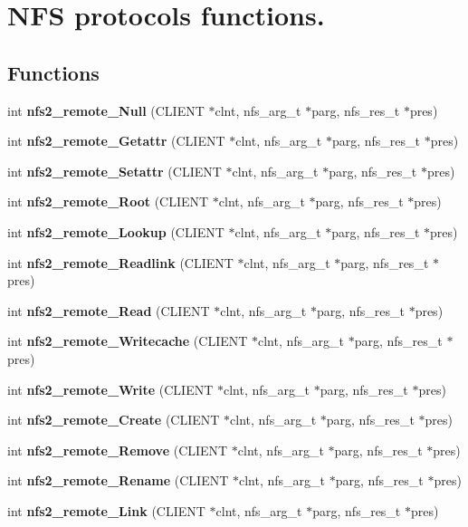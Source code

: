 \section{NFS protocols functions.}
\label{group__NFSprocs}
\subsection*{Functions}
\begin{CompactItemize}
\item 
int {\bf nfs2\_\-remote\_\-Null} (CLIENT $\ast$clnt, nfs\_\-arg\_\-t $\ast$parg, nfs\_\-res\_\-t $\ast$pres)
\item 
int {\bf nfs2\_\-remote\_\-Getattr} (CLIENT $\ast$clnt, nfs\_\-arg\_\-t $\ast$parg, nfs\_\-res\_\-t $\ast$pres)
\item 
int {\bf nfs2\_\-remote\_\-Setattr} (CLIENT $\ast$clnt, nfs\_\-arg\_\-t $\ast$parg, nfs\_\-res\_\-t $\ast$pres)
\item 
int {\bf nfs2\_\-remote\_\-Root} (CLIENT $\ast$clnt, nfs\_\-arg\_\-t $\ast$parg, nfs\_\-res\_\-t $\ast$pres)
\item 
int {\bf nfs2\_\-remote\_\-Lookup} (CLIENT $\ast$clnt, nfs\_\-arg\_\-t $\ast$parg, nfs\_\-res\_\-t $\ast$pres)
\item 
int {\bf nfs2\_\-remote\_\-Readlink} (CLIENT $\ast$clnt, nfs\_\-arg\_\-t $\ast$parg, nfs\_\-res\_\-t $\ast$pres)
\item 
int {\bf nfs2\_\-remote\_\-Read} (CLIENT $\ast$clnt, nfs\_\-arg\_\-t $\ast$parg, nfs\_\-res\_\-t $\ast$pres)
\item 
int {\bf nfs2\_\-remote\_\-Writecache} (CLIENT $\ast$clnt, nfs\_\-arg\_\-t $\ast$parg, nfs\_\-res\_\-t $\ast$pres)
\item 
int {\bf nfs2\_\-remote\_\-Write} (CLIENT $\ast$clnt, nfs\_\-arg\_\-t $\ast$parg, nfs\_\-res\_\-t $\ast$pres)
\item 
int {\bf nfs2\_\-remote\_\-Create} (CLIENT $\ast$clnt, nfs\_\-arg\_\-t $\ast$parg, nfs\_\-res\_\-t $\ast$pres)
\item 
int {\bf nfs2\_\-remote\_\-Remove} (CLIENT $\ast$clnt, nfs\_\-arg\_\-t $\ast$parg, nfs\_\-res\_\-t $\ast$pres)
\item 
int {\bf nfs2\_\-remote\_\-Rename} (CLIENT $\ast$clnt, nfs\_\-arg\_\-t $\ast$parg, nfs\_\-res\_\-t $\ast$pres)
\item 
int {\bf nfs2\_\-remote\_\-Link} (CLIENT $\ast$clnt, nfs\_\-arg\_\-t $\ast$parg, nfs\_\-res\_\-t $\ast$pres)
\item 

\end{CompactItemize}
